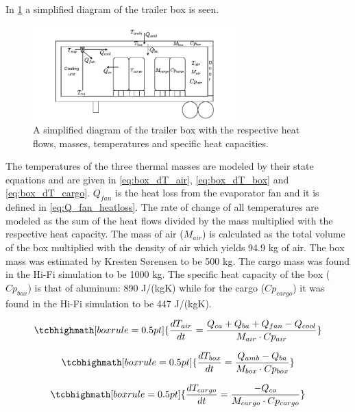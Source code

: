 In \cref{fig:box_diagram} a simplified diagram of the trailer box is seen.

\begin{figure}[h]
	\centering
	\includegraphics[width=0.7\textwidth]{Graphics/Box.pdf}
	\caption{A simplified diagram of the trailer box with the respective heat flows, masses, temperatures and specific heat capacities.}
	\label{fig:box_diagram}
\end{figure}


The temperatures of the three thermal masses are modeled by their state equations and are given in \cref{eq:box_dT_air}, \cref{eq:box_dT_box} and \cref{eq:box_dT_cargo}. $Q_{fan}$ is the heat loss from the evaporator fan and it is defined in \cref{eq:Q_fan_heatloss}. The rate of change of all temperatures are modeled as the sum of the heat flows divided by the mass multiplied with the respective heat capacity. The mass of air ($M_{air}$) is calculated as the total volume of the box multiplied with the density of air which yields 94.9 \si{kg} of air. The box mass was estimated by Kresten Sørensen to be 500 \si{kg}. The cargo mass was found in the Hi-Fi simulation to be 1000 \si{kg}. The specific heat capacity of the box ($Cp_{box}$) is that of aluminum: 890 \si{J}/(\si{kg}\si{K}) while for the cargo ($Cp_{cargo}$) it was found in the Hi-Fi simulation to be 447 \si{J}/(\si{kg}\si{K}).

\begin{equation}
	\tcbhighmath[boxrule = 0.5pt]{\frac{dT_{air}}{dt} = \frac{Q_{ca} + Q_{ba} + Q_{fan} -Q_{cool}}{M_{air} \cdot Cp_{air}}} \label{eq:box_dT_air}
\end{equation}

\begin{equation}
	\tcbhighmath[boxrule = 0.5pt]{\frac{dT_{box}}{dt} = \frac{Q_{amb} - Q_{ba}}{M_{box} \cdot Cp_{box}}} \label{eq:box_dT_box}
\end{equation}

\begin{equation}
	\tcbhighmath[boxrule = 0.5pt]{\frac{dT_{cargo}}{dt} = \frac{-Q_{ca}}{M_{cargo} \cdot Cp_{cargo}}} \label{eq:box_dT_cargo}
\end{equation}



